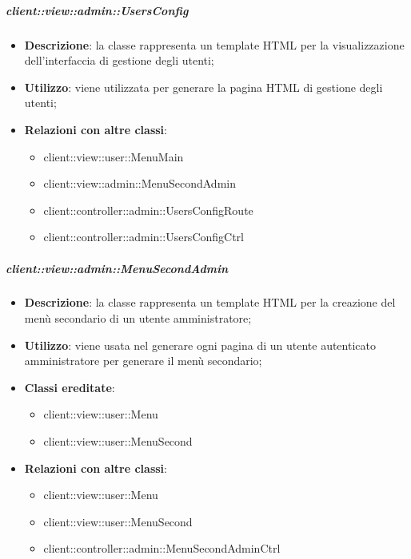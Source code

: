 		\subparagraph{client::view::admin::UsersConfig} %
		\label{subp:bdsm_app_client_view_admin_usersconfig}
			\begin{itemize}
				\item \textbf{Descrizione}: la classe rappresenta un template HTML per la visualizzazione dell'interfaccia di gestione degli utenti;
				\item \textbf{Utilizzo}: viene utilizzata per generare la pagina HTML di gestione degli utenti;
				\item \textbf{Relazioni con altre classi}:
					\begin{itemize}
						\item client::view::user::MenuMain
						\item client::view::admin::MenuSecondAdmin
						\item client::controller::admin::UsersConfigRoute
						\item client::controller::admin::UsersConfigCtrl
					\end{itemize}
			\end{itemize}

		\subparagraph{client::view::admin::MenuSecondAdmin} %
		\label{subp:bdsm_app_client_view_admin_menusecondadmin}
			\begin{itemize}
				\item \textbf{Descrizione}: la classe rappresenta un template HTML per la creazione del menù secondario di un utente amministratore;
				\item \textbf{Utilizzo}: viene usata nel generare ogni pagina di un utente autenticato amministratore per generare il menù secondario;
				\item \textbf{Classi ereditate}:
					\begin{itemize}
						\item client::view::user::Menu
						\item client::view::user::MenuSecond
					\end{itemize}
				\item \textbf{Relazioni con altre classi}:
					\begin{itemize}
						\item client::view::user::Menu
						\item client::view::user::MenuSecond
						\item client::controller::admin::MenuSecondAdminCtrl
					\end{itemize}
			\end{itemize}

